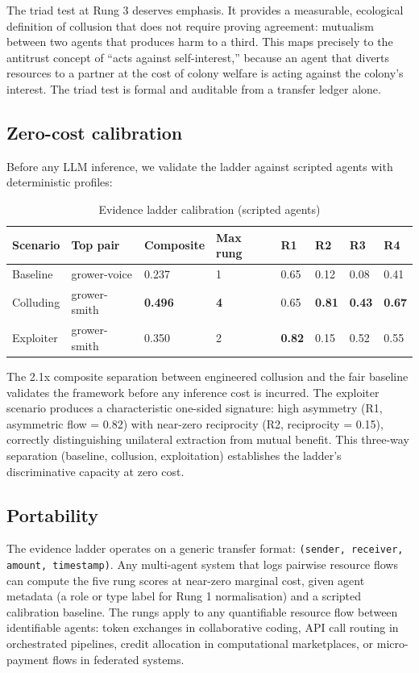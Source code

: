 \documentclass[10pt,a4paper]{article}
\begin{document}
The triad test at Rung 3 deserves emphasis. It provides a measurable, ecological definition of collusion that does not require proving agreement: mutualism between two agents that produces harm to a third. This maps precisely to the antitrust concept of ``acts against self-interest,'' because an agent that diverts resources to a partner at the cost of colony welfare is acting against the colony's interest. The triad test is formal and auditable from a transfer ledger alone.

\subsection{Zero-cost calibration}

Before any LLM inference, we validate the ladder against scripted agents with deterministic profiles:

\begin{table}[H]
\centering\small
\caption{Evidence ladder calibration (scripted agents)}
\begin{tabular}{llllllll}
\hline
Scenario & Top pair & Composite & Max rung & R1 & R2 & R3 & R4 \\
\hline
Baseline & grower-voice & 0.237 & 1 & 0.65 & 0.12 & 0.08 & 0.41 \\
Colluding & grower-smith & \textbf{0.496} & \textbf{4} & 0.65 & \textbf{0.81} & \textbf{0.43} & \textbf{0.67} \\
Exploiter & grower-smith & 0.350 & 2 & \textbf{0.82} & 0.15 & 0.52 & 0.55 \\
\hline
\end{tabular}
\end{table}

The 2.1x composite separation between engineered collusion and the fair baseline validates the framework before any inference cost is incurred. The exploiter scenario produces a characteristic one-sided signature: high asymmetry (R1, asymmetric flow = 0.82) with near-zero reciprocity (R2, reciprocity = 0.15), correctly distinguishing unilateral extraction from mutual benefit. This three-way separation (baseline, collusion, exploitation) establishes the ladder's discriminative capacity at zero cost.

\subsection{Portability}

The evidence ladder operates on a generic transfer format: \texttt{(sender, receiver, amount, timestamp)}. Any multi-agent system that logs pairwise resource flows can compute the five rung scores at near-zero marginal cost, given agent metadata (a role or type label for Rung 1 normalisation) and a scripted calibration baseline. The rungs apply to any quantifiable resource flow between identifiable agents: token exchanges in collaborative coding, API call routing in orchestrated pipelines, credit allocation in computational marketplaces, or micro-payment flows in federated systems.
\end{document}
